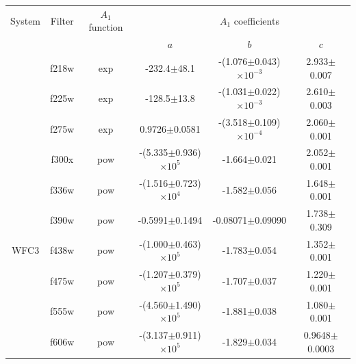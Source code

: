 \documentclass[12pt, a4paper]{report}
\begin{document}
\begin{table}
\begin{tabular}{cccccc}
\hline
System & Filter & $A_{1}$ function & & $A_{1}$ coefficients & \\
 & & & $a$ & $b$ & $c$ \\
\hline
& f218w & exp & -232.4$\pm$48.1 & -(1.076$\pm$0.043)$\times 10^{-3}$ & 2.933$\pm$0.007 \\
& f225w & exp & -128.5$\pm$13.8 & -(1.031$\pm$0.022)$\times 10^{-3}$ & 2.610$\pm$0.003 \\
& f275w & exp & 0.9726$\pm$0.0581 & -(3.518$\pm$0.109)$\times 10^{-4}$ & 2.060$\pm$0.001 \\
& f300x & pow & -(5.335$\pm$0.936)$\times 10^{5}$ & -1.664$\pm$0.021 & 2.052$\pm$0.001 \\
& f336w & pow & -(1.516$\pm$0.723)$\times 10^{4}$ & -1.582$\pm$0.056 & 1.648$\pm$0.001 \\
& f390w & pow & -0.5991$\pm$0.1494 & -0.08071$\pm$0.09090 & 1.738$\pm$0.309 \\
WFC3 & f438w & pow & -(1.000$\pm$0.463)$\times 10^{5}$ & -1.783$\pm$0.054 & 1.352$\pm$0.001 \\
& f475w & pow & -(1.207$\pm$0.379)$\times 10^{5}$ & -1.707$\pm$0.037 & 1.220$\pm$0.001 \\
& f555w & pow & -(4.560$\pm$1.490)$\times 10^{5}$ & -1.881$\pm$0.038 & 1.080$\pm$0.001 \\
& f606w & pow & -(3.137$\pm$0.911)$\times 10^{5}$ & -1.829$\pm$0.034 & 0.9648$\pm$0.0003 \\

\end{tabular}
\end{table}
\end{document}
